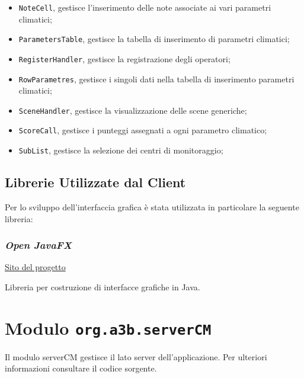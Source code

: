 \begin{itemize}
\begin{itemize}
		\item \texttt{NoteCell}, gestisce l'inserimento delle note associate ai vari parametri climatici;
		\item \texttt{ParametersTable}, gestisce la tabella di inserimento di parametri climatici;
		\item \texttt{RegisterHandler}, gestisce la registrazione degli operatori;
		\item \texttt{RowParametres}, gestisce i singoli dati nella tabella di inserimento parametri climatici;
		\item \texttt{SceneHandler}, gestisce la visualizzazione delle scene generiche;
		\item \texttt{ScoreCall}, gestisce i punteggi assegnati a ogni parametro climatico;
		\item \texttt{SubList}, gestisce la selezione dei centri di monitoraggio;
	\end{itemize}
\end{itemize}

\section{Librerie Utilizzate dal Client}
Per lo sviluppo dell'interfaccia grafica è stata utilizzata in particolare la seguente libreria:

\subsection{\textsl{Open JavaFX}}
\label{ch:javafx}

\href{https://openjfx.io/}{Sito del progetto}

Libreria per costruzione di interfacce grafiche in Java.

\chapter{Modulo \texttt{org.a3b.serverCM}}
Il modulo serverCM gestisce il lato server dell'applicazione. Per ulteriori informazioni consultare il codice sorgente.
\label{ch:server}

